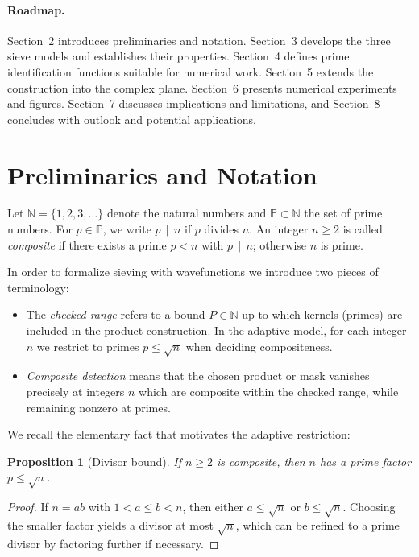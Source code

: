 \documentclass[12pt]{article}
\newtheorem{proposition}{Proposition}
\theoremstyle{definition}
\theoremstyle{remark}
\newcommand{\N}{\mathbb{N}}
\newcommand{\Primes}{\mathbb{P}}
\newcommand{\divides}{\,\mid\,}
\begin{document}
\paragraph{Roadmap.} 
Section~2 introduces preliminaries and notation. Section~3 develops the three sieve models and establishes their properties. Section~4 defines prime identification functions suitable for numerical work. Section~5 extends the construction into the complex plane. Section~6 presents numerical experiments and figures. Section~7 discusses implications and limitations, and Section~8 concludes with outlook and potential applications.

\section{Preliminaries and Notation}

Let $\N = \{1,2,3,\dots\}$ denote the natural numbers and $\Primes \subset \N$ the set of prime numbers. For $p \in \Primes$, we write $p \divides n$ if $p$ divides $n$. An integer $n \ge 2$ is called \emph{composite} if there exists a prime $p < n$ with $p \divides n$; otherwise $n$ is prime.

In order to formalize sieving with wavefunctions we introduce two pieces of terminology:

\begin{itemize}
    \item The \emph{checked range} refers to a bound $P \in \N$ up to which kernels (primes) are included in the product construction. In the adaptive model, for each integer $n$ we restrict to primes $p \le \sqrt{n}$ when deciding compositeness.
    \item \emph{Composite detection} means that the chosen product or mask vanishes precisely at integers $n$ which are composite within the checked range, while remaining nonzero at primes.
\end{itemize}

We recall the elementary fact that motivates the adaptive restriction:

\begin{proposition}[Divisor bound]\label{prop:divisor}
If $n \ge 2$ is composite, then $n$ has a prime factor $p \le \sqrt{n}$.
\end{proposition}
\begin{proof}
If $n = ab$ with $1 < a \le b < n$, then either $a \le \sqrt{n}$ or $b \le \sqrt{n}$. Choosing the smaller factor yields a divisor at most $\sqrt{n}$, which can be refined to a prime divisor by factoring further if necessary.
\end{proof}
\end{document}
